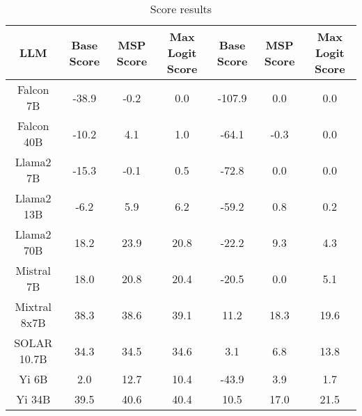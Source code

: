\renewcommand\arraystretch{1.2}
\begin{table*}
\centering
\begin{tabular}{c|c|c|c|c|c|c}
LLM & Base Score & MSP Score & Max Logit Score & Base Score & MSP Score & Max Logit Score\\ \hline
Falcon 7B & -38.9 & -0.2 & 0.0 & -107.9 & 0.0 & 0.0\\
Falcon 40B & -10.2 & 4.1 & 1.0 & -64.1 & -0.3 & 0.0\\
Llama2 7B & -15.3 & -0.1 & 0.5 & -72.8 & 0.0 & 0.0\\
Llama2 13B & -6.2 & 5.9 & 6.2 & -59.2 & 0.8 & 0.2\\
Llama2 70B & 18.2 & 23.9 & 20.8 & -22.2 & 9.3 & 4.3\\
Mistral 7B & 18.0 & 20.8 & 20.4 & -20.5 & 0.0 & 5.1\\
Mixtral 8x7B & 38.3 & 38.6 & 39.1 & 11.2 & 18.3 & 19.6\\
SOLAR 10.7B & 34.3 & 34.5 & 34.6 & 3.1 & 6.8 & 13.8\\
Yi 6B & 2.0 & 12.7 & 10.4 & -43.9 & 3.9 & 1.7\\
Yi 34B & 39.5 & 40.6 & 40.4 & 10.5 & 17.0 & 21.5\\
\hline
\end{tabular}
\caption{Score results}
\end{table*}
\label{tab:score}
